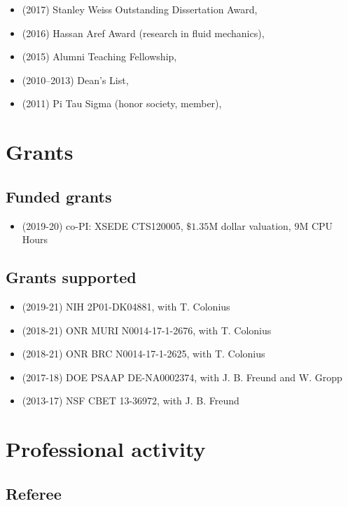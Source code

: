 \begin{itemize}
    \item (2017) Stanley Weiss Outstanding Dissertation Award, \UIUC
    \item (2016) Hassan Aref Award (research in fluid mechanics), \UIUC
    \item (2015) Alumni Teaching Fellowship, \UIUC
    \item (2010--2013) Dean's List, \UMD
    \item (2011) Pi Tau Sigma (honor society, member), \UMD
\end{itemize}

\section{Grants}

\subsection{Funded grants}

\begin{itemize}
    \item (2019-20) co-PI: XSEDE CTS120005, $\$1.35$M dollar valuation, 9M CPU Hours
\end{itemize}

\subsection{Grants supported}

\begin{itemize}
    \item (2019-21) NIH 2P01-DK04881, with T. Colonius
    \item (2018-21) ONR MURI N0014-17-1-2676, with T. Colonius
    \item (2018-21) ONR BRC N0014-17-1-2625, with T. Colonius
    \item (2017-18) DOE PSAAP DE-NA0002374, with J. B. Freund and W. Gropp
    \item (2013-17) NSF CBET 13-36972, with J. B. Freund
\end{itemize}

\section{Professional activity}

\subsection{Referee}

